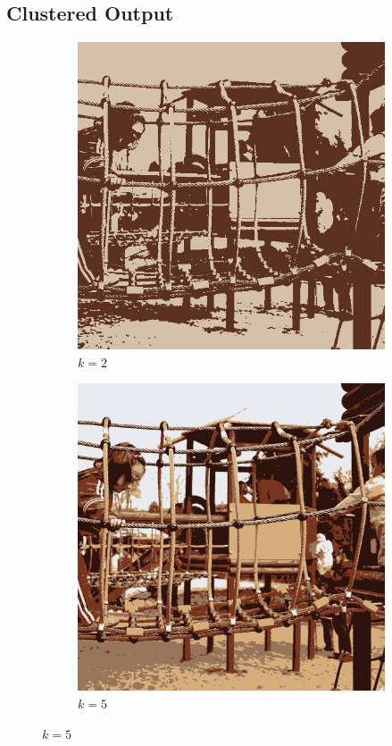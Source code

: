 \documentclass{article}
\begin{document}
\subsection{Clustered Output}
\begin{figure}[H]
\begin{adjustwidth}{2cm}{}

    \begin{subfigure}[b]{0.40\textwidth}
        \includegraphics[width=\textwidth]{image_clustered_2.jpg}
        \caption{\(k=2\)}
    \end{subfigure}
    \hfill
    \begin{subfigure}[b]{0.40\textwidth}
        \includegraphics[width=\textwidth]{image_clustered_5.jpg}
        \caption{\(k=5\)}
    \end{subfigure}
    

\end{adjustwidth}
\end{figure}
\end{document}
